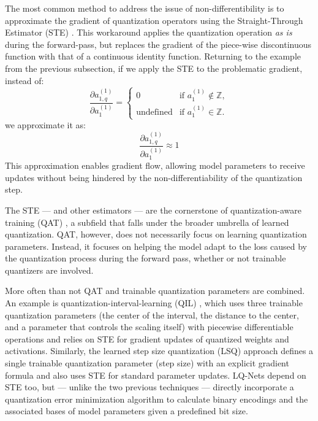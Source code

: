 \hspace*{1em}The most common method to address the issue of non-differentibility is to approximate the gradient of quantization operators
using the Straight-Through Estimator (STE) \cite{bengio2013estimating, fan2021training, DBLP:conf/eccv/ZhangYYH18}. 
This workaround applies the quantization operation \textit{as is} 
during the forward-pass, but replaces the gradient of the piece-wise discontinuous function 
with that of a continuous identity function. Returning to the example from the previous subsection,
if we apply the STE to the problematic gradient, instead of:
\[
  \frac{\partial a_{1,q}^{(1)}}{\partial a_{1}^{(1)}} =
  \begin{cases} 
      0 & \text{if } a_{1}^{(1)} \notin \mathbb{Z}, \\
      \text{undefined} & \text{if } a_{1}^{(1)} \in \mathbb{Z}.
  \end{cases}
  \]
we approximate it as: 
\[
  \frac{\partial a_{1,q}^{(1)}}{\partial a_{1}^{(1)}}  \approx 1
  \]
This approximation enables gradient flow, allowing model parameters to receive updates
without being hindered by the non-differentiability of the quantization step.

The STE — and other estimators \cite{DBLP:journals/jstsp/Chen0ZHY20} —  are the cornerstone of quantization-aware training (QAT) \cite{jacob2018quantization},
a subfield that falls under the broader umbrella of learned quantization.
QAT, however, does not necessarily focus on learning quantization parameters.
Instead, it focuses on helping the model adapt to the loss caused by the quantization process during the forward pass,
whether or not trainable quantizers are involved.

More often than not QAT and trainable quantization parameters are combined. 
An example is quantization-interval-learning (QIL) \cite{DBLP:conf/cvpr/JungSLSHKHC19}, 
which uses three trainable quantization parameters 
(the center of the interval, the distance to the center, and a parameter that controls the scaling itself) 
with piecewise differentiable operations and relies on STE for gradient updates of quantized weights and activations. 
Similarly, the learned step size quantization (LSQ) approach \cite{DBLP:conf/iclr/EsserMBAM20} 
defines a single trainable quantization parameter (step size) with an explicit gradient formula and also uses STE for standard parameter updates.
LQ-Nets \cite{DBLP:conf/eccv/ZhangYYH18} depend on STE too, but  —  unlike the two previous techniques — 
directly incorporate a quantization error minimization algorithm to calculate binary encodings and the associated bases of
model parameters given a predefined bit size. 

